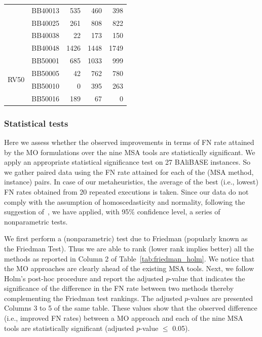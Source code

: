 \begin{table}[htbp]
\begin{tabular}{|c|l|r|r|r|}
		\cline{2-5}          & BB40013 & 535   & 460   & 398 \\
		\cline{2-5}     & BB40025 & 261   & 808   & 822 \\
		\cline{2-5}     & BB40038 & 22    & 173   & 150 \\
		\cline{2-5}     & BB40048 & 1426  & 1448  & 1749 \\
		\hline
		\multirow{4}{*}{RV50} & BB50001 & 685   & 1033  & 999 \\
		\cline{2-5}          & BB50005 & 42    & 762   & 780 \\
		\cline{2-5}          & BB50010 & 0     & 395   & 263 \\
		\cline{2-5}          & BB50016 & 189   & 67    & 0 \\
		\hline
	\end{tabular}%
	\label{tab:superior_solutions}%
\end{table}%




\subsubsection{Statistical tests}
Here we assess whether the observed improvements in terms of FN rate attained by the MO formulations over the nine  MSA tools are statistically significant.
We apply an appropriate statistical significance test on 27 BAliBASE instances. So we gather paired data using the FN rate attained for each of the (MSA method, instance) pairs. In case of our metaheuristics, the average of the best (i.e., lowest) FN rates obtained from 20 repeated executions is taken. Since our data do not comply with the assumption of homoscedasticity and normality, following the suggestion of~\cite{derrac2011practical}, we have applied, with 95\% confidence level, a series of nonparametric tests.  


We first perform a (nonparametric) test due to Friedman (popularly known as the Friedman Test). Thus we are able to rank (lower rank implies better) all the methods as reported in Column 2 of Table~\ref{tab:friedman_holm}. We notice that the MO approaches are clearly ahead of the existing MSA tools. Next, we follow Holm's post-hoc procedure and report the adjusted $p$-value that indicates the significance of the difference in the FN rate between two methods thereby complementing the Friedman test rankings. The adjusted $p$-values are presented Columns 3 to 5 of the same table. 
These values show that the observed difference (i.e., improved FN rates) between a MO approach and each of the nine MSA tools are statistically significant (adjusted $p$-value $\le$ 0.05).

